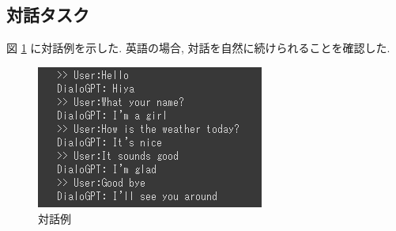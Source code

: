 \documentclass[twocolumn]{jarticle}     %
\begin{document}
\subsection{対話タスク}

図 \ref{fig:con} に対話例を示した.
英語の場合, 対話を自然に続けられることを確認した.

\begin{figure}[tb]
  \begin{center}
    \includegraphics[clip,width=75mm]{ss.png}
    \caption{対話例}
    \label{fig:con}
  \end{center}
\end{figure}





\end{document}

